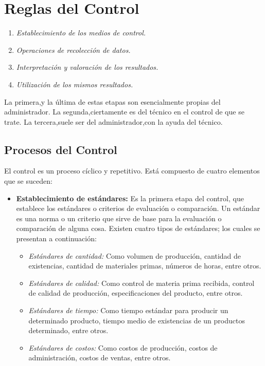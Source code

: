 \documentclass[12pt,letterpaper]{article}
\begin{document}
\section{Reglas del Control}
\begin{enumerate}
\item	\textit{Establecimiento de los medios de control.}
\item	\textit{Operaciones de recolección de datos.}
\item	\textit{Interpretación y valoración de los resultados.}
\item	\textit{Utilización de los mismos resultados.}
\end{enumerate}
La primera,y la última de estas etapas son esencialmente propias del
administrador.
La segunda,ciertamente es del técnico en el control de que se trate. La
tercera,suele ser del administrador,con la ayuda del técnico.
\subsection{Procesos del Control}
El control es un proceso cíclico y repetitivo. Está compuesto de cuatro elementos que se suceden:
\begin{itemize}
\item \textbf{Establecimiento de estándares:} Es la primera etapa del control, que establece los estándares o criterios de evaluación o comparación. Un estándar es una norma o un criterio que sirve de base para la evaluación o comparación de alguna cosa. Existen cuatro tipos de estándares; los cuales se presentan a continuación:
\begin{itemize}
\item \textit{Estándares de cantidad:} Como volumen de producción, cantidad de existencias, cantidad de materiales primas, números de horas, entre otros.
\item \textit{Estándares de calidad:} Como control de materia prima recibida, control de calidad de producción, especificaciones del producto, entre otros.
\item \textit{Estándares de tiempo:} Como tiempo estándar para producir un determinado producto, tiempo medio de existencias de un productos determinado, entre otros.
\item \textit{Estándares de costos:} Como costos de producción, costos de administración, costos de ventas, entre otros.
\end{itemize}
\end{itemize}
\end{document}
